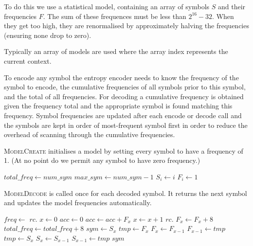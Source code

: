 \documentclass[a4paper]{article}
\begin{document}
To do this we use a statistical model, containing an array of symbols $S$ and their frequencies $F$.
The sum of these frequences must be less than $2^{16}-32$.
When they get too high, they are renormalised by approximately halving the frequencies (ensuring none drop to zero).

Typically an array of models are used where the array index represents the current context.

To encode any symbol the entropy encoder needs to know the frequency of the symbol to encode, the cumulative frequencies of all symbols prior to this symbol, and the total of all frequencies.
For decoding a cumulative frequency is obtained given the frequency total and the appropriate symbol is found matching this frequency.
Symbol frequencies are updated after each encode or decode call and the symbols are kept in order of most-frequent symbol first in order to  reduce the overhead of scanning through the cumulative frequencies.

\textsc{ModelCreate} initialises a model by setting every symbol to have a frequency of 1.
(At no point do we permit any symbol to have zero frequency.)

\begin{algorithmic}[1]
  \State $total\_freq \gets num\_sym$
  \State $max\_sym \gets num\_sym-1$
    \State $S_i \gets i$
    \State $F_i \gets 1$
  \EndFor
\EndProcedure
\end{algorithmic}

\textsc{ModelDecode} is called once for each decoded symbol.
It returns the next symbol and updates the model frequencies automatically.

\begin{algorithmic}[1]
  \State $freq \gets$ $rc.$
  \State $x \gets 0$
  \State $acc \gets 0$
    \State $acc \gets acc + F_x$
    \State $x \gets x+1$
  \EndWhile
  \State $rc.$
  \State $F_x \gets F_x + 8$ 
  \State $total\_freq \gets total\_freq + 8$
    \State {}
  \EndIf
  \State $sym \gets S_x$
    \State $tmp \gets F_x$ 
    \State $F_x \gets F_{x-1}$
    \State $F_{x-1} \gets tmp$
    \State $tmp \gets S_x$ 
    \State $S_x \gets S_{x-1}$
    \State $S_{x-1} \gets tmp$
  \EndIf
  \State \Return $sym$
\EndFunction
\end{algorithmic}
\end{document}
